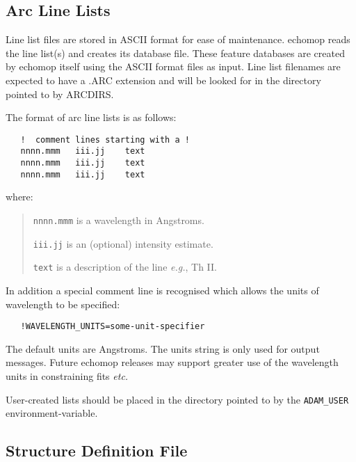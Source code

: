 \subsection{Arc Line Lists}

Line list files are stored in ASCII format for ease of maintenance.
{\sc echomop} reads the line list(s) and creates its database file. These
feature databases are created by {\sc echomop} itself using the ASCII format
files as input. Line list filenames are expected to have a .ARC
extension and will be looked for in the directory pointed to by ARCDIRS.

The format of arc line lists is as follows:

\begin{verbatim}
   !  comment lines starting with a !
   nnnn.mmm   iii.jj    text
   nnnn.mmm   iii.jj    text
   nnnn.mmm   iii.jj    text
\end{verbatim}

where:

\begin{quote}

   {\tt nnnn.mmm}   is a wavelength in Angstroms.

   {\tt iii.jj}     is an (optional) intensity estimate.

   {\tt text}       is a description of the line {\it{e.g.}}, Th II.

\end{quote}

In addition a special comment line is recognised which allows the units
of wavelength to be specified:

\begin{verbatim}
   !WAVELENGTH_UNITS=some-unit-specifier
\end{verbatim}

The default units are Angstroms.  The units string is only used for output
messages.  Future {\sc echomop} releases may support greater use of the
wavelength units in constraining fits {\it etc.}

User-created lists should be placed in the directory pointed to by the
\verb+ADAM_USER+ environment-variable.


\subsection{Structure Definition File}

